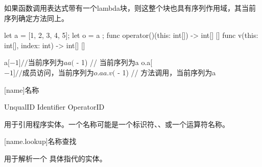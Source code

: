\pnum
如果函数调用表达式带有一个lambda块，则这整个块也具有序列作用域，其当前序列确定方法同上。

\enterexample

\begin{codeblock}
let a = [1, 2, 3, 4, 5];
let o = { a };
func operator()(this: int[]) -> int[] { [] }
func v(this: int[], index: int) -> int[] { [] }

a[$ - 1] // 当前序列为a
a($ - 1) // 当前序列为a
o.a[$ - 1] // 成员访问，当前序列为o.a
a.v($ - 1) // 方法调用，当前序列为a

\end{codeblock}

\exitexample

[name]{名称}

\begin{bnf}{UnqualID}
    Identifier \br
     \br
     \br
    OperatorID
\end{bnf}

\pnum
{}用于引用程序实体。一个名称可能是一个标识符、、或一个运算符名称。

[name.lookup]{名称查找}

\pnum
{}用于解析一个  具体指代的实体。
